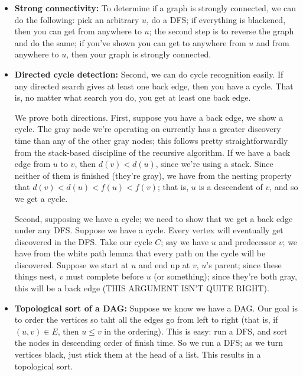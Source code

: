 \documentclass{article}
\begin{document}
\begin{itemize}
\item
\textbf{Strong connectivity:}
To determine if a graph is strongly connected, we can do the 
following: pick an arbitrary $u$, do a DFS; if everything is blackened, then
you can get from anywhere to $u$; the second step is to 
reverse the graph and do the same; if you've shown you can get to anywhere 
from $u$
and from anywhere to $u$, then your graph is strongly connected.

\item
\textbf{Directed cycle detection:}
Second, we can do cycle recognition  easily.
If any directed search gives at least one back edge, then you have a cycle.
That is, no matter what search you do, you get at least one back edge.

We prove both directions.
First, suppose you have a back edge, we show a cycle.
The gray node we're operating on currently has a greater discovery
time than any of the other gray  nodes; this follows pretty straightforwardly
from the stack-based discipline of the recursive algorithm.
If we have a back edge from $u$ to $v$, then $d(v) < d(u)$, since we're
using a stack. Since neither of them is finished (they're gray), we have from
the nesting property that $d(v) < d(u) < f(u) < f(v)$; that is, $u$
is a descendent of $v$, and so we get a cycle.

Second, supposing we have a cycle; we need to show that we get a  back
edge under any DFS.
Suppose we have a cycle.
Every vertex will eventually get discovered in the DFS.
Take our cycle $C$; say we have $u$ and predecessor $v$; we have from the
white path lemma that every path on the cycle will be discovered.
Suppose we start at $u$ and end up at $v$, $u$'s parent; since
these things nest, $v$ must complete before $u$ (or something); since they're
both gray, this will be a back edge (THIS ARGUMENT ISN'T QUITE RIGHT).


\item
\textbf{Topological sort of a DAG:}
Suppose we know we have a DAG.
Our goal is to order the vertices so taht all the edges go from left to
right (that is, if $(u,v) \in E$, then $u\leq v$ in the ordering).
This is easy: run a DFS, and sort the nodes in descending order of
finish time.
So we run a DFS; as we turn vertices black, just stick them at the head of a 
list.
This results in a topological sort.


\end{itemize}
\end{document}

